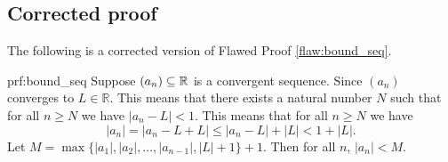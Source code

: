 \clearpage
\subsection{Corrected proof}

The following is a corrected version of Flawed Proof \ref{flaw:bound_seq}. %

\begin{prf}{prf:bound_seq} %
Suppose $(a_n) \subseteq \mathbb R$ is a convergent sequence.
Since $(a_n)$ converges to $L \in \mathbb{R}$. This means that there exists a natural number $N$ such that for all $n \geq N$ we have $|a_n - L| < 1$. This means that for all $n \geq N$ we have
$$|a_n| = |a_n - L + L| \leq |a_n - L| + |L| < 1 + |L|. $$
Let $M = \max\{|a_1|, |a_2|, ...,|a_{n-1}|, |L|+1\} + 1 $. Then for all $n$, $|a_n| < M$.

\end{prf} 